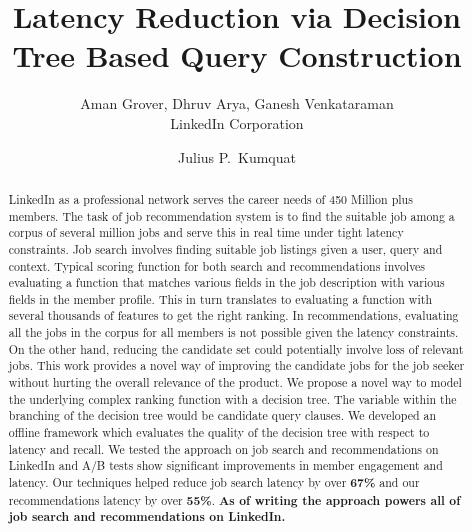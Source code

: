 \documentclass[sigconf]{acmart}
\begin{document}
\title{Latency Reduction via Decision Tree Based Query Construction}
\author{Aman Grover, Dhruv Arya, Ganesh Venkataraman\\ LinkedIn Corporation}

\begin{abstract}
LinkedIn as a professional network serves the career needs of 450 Million plus members. 
The task of job recommendation system is to find the suitable job among a corpus of several million jobs and serve this in real time under tight latency constraints. 
Job search involves finding suitable job listings given a user, query and
context.  Typical scoring function for both search and recommendations 
involves evaluating a function that matches various fields in the job description 
with various fields in the member profile.
This in turn translates to evaluating a function with several thousands of features to get the right ranking. 
In recommendations, evaluating all the jobs in the corpus for all members is not possible given the latency constraints. 
On the other hand, reducing the candidate set could 
potentially involve loss of relevant jobs. 
This work provides a novel way of improving the candidate jobs for the job seeker without hurting the overall relevance of the product. 
We propose a novel way to model the underlying complex ranking function with a
decision tree. The variable within the branching of the decision tree would be
candidate query clauses. We developed an offline framework which
evaluates the quality of the decision tree with respect to latency and recall.
We tested the approach on job search and recommendations on LinkedIn and A/B tests show significant improvements in member engagement and latency. 
Our techniques helped reduce job search latency by over {\bf 67\%} and our
recommendations latency by over {\bf 55\%}.
{\bf As of writing the approach powers all of job search and recommendations on LinkedIn.} 
\end{abstract}

\maketitle



\author{Julius P.~Kumquat }

\renewcommand{\shortauthors}{B. Trovato et al.}
\end{document}
